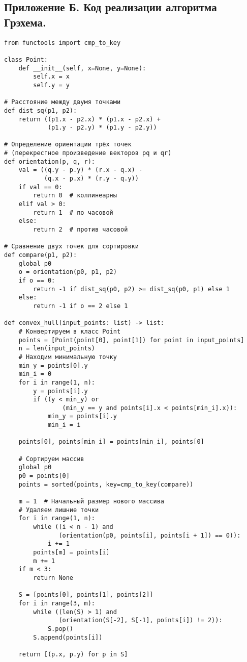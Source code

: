 \newpage

\subsection*{Приложение Б. Код реализации алгоритма Грэхема.}

\begin{verbatim}
from functools import cmp_to_key

class Point:
    def __init__(self, x=None, y=None):
        self.x = x
        self.y = y

# Расстояние между двумя точками
def dist_sq(p1, p2):
    return ((p1.x - p2.x) * (p1.x - p2.x) +
            (p1.y - p2.y) * (p1.y - p2.y))

# Определение ориентации трёх точек
# (перекрестное произведение векторов pq и qr)
def orientation(p, q, r):
    val = ((q.y - p.y) * (r.x - q.x) -
           (q.x - p.x) * (r.y - q.y))
    if val == 0:
        return 0  # коллинеарны
    elif val > 0:
        return 1  # по часовой
    else:
        return 2  # против часовой

# Сравнение двух точек для сортировки
def compare(p1, p2):
    global p0
    o = orientation(p0, p1, p2)
    if o == 0:
        return -1 if dist_sq(p0, p2) >= dist_sq(p0, p1) else 1
    else:
        return -1 if o == 2 else 1

def convex_hull(input_points: list) -> list:
    # Конвертируем в класс Point
    points = [Point(point[0], point[1]) for point in input_points]
    n = len(input_points)
    # Находим минимальную точку
    min_y = points[0].y
    min_i = 0
    for i in range(1, n):
        y = points[i].y
        if ((y < min_y) or
                (min_y == y and points[i].x < points[min_i].x)):
            min_y = points[i].y
            min_i = i

    points[0], points[min_i] = points[min_i], points[0]

    # Сортируем массив
    global p0
    p0 = points[0]
    points = sorted(points, key=cmp_to_key(compare))

    m = 1  # Начальный размер нового массива
    # Удаляем лишние точки
    for i in range(1, n):
        while ((i < n - 1) and
               (orientation(p0, points[i], points[i + 1]) == 0)):
            i += 1
        points[m] = points[i]
        m += 1
    if m < 3:
        return None

    S = [points[0], points[1], points[2]]
    for i in range(3, m):
        while ((len(S) > 1) and
               (orientation(S[-2], S[-1], points[i]) != 2)):
            S.pop()
        S.append(points[i])

    return [(p.x, p.y) for p in S]
\end{verbatim}


